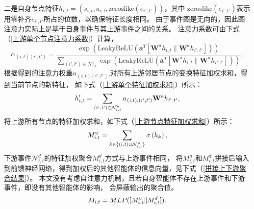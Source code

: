 二是自身节点特征$h_{i,t}=(s_{i,t},a_{i,t},\text{zeroslike}(e_{i',t'}))$，其中
zeroslike$(e_{i',t'})$表示用零补齐$e_{i',t'}$所占的位数，以确保特征长度相同。
由于事件图是无向的，因此图注意力实际上是基于自身事件与其上游事件之间的关系。
注意力系数可由下式（\ref{上游单个节点注意力系数}）计算，
\begin{equation}\label{上游单个节点注意力系数}
\alpha_{(i,t)(i',t')} = \frac{\exp\left(\text{LeakyReLU}\left(\mathbf{a}^T [\mathbf{W}^a h_{i,t} \| \mathbf{W}^a h_{i',t'}]\right)\right)}{\sum_{(i',t')\in\mathcal{N}_{i,t}^u} \exp\left(\text{LeakyReLU}\left(\mathbf{a}^T [\mathbf{W}^a h_{i,t} \| \mathbf{W}^a h_{i',t'}]\right)\right)},
\end{equation}
根据得到的注意力权重$\alpha_{(i,t)(i',t')}$,对所有上游邻居节点的变换特征加权求和，得到当前节点的新特征，
如下式（\ref{上游单个特征加权求和}）所示：
\begin{equation}\label{上游单个特征加权求和}
    \\h'_{i,t} = \sum_{(i',t')\in\mathcal{N}^u_{i,t}} \alpha_{(i,t),(i',t')} \mathbf{W}^a h_{i',t'},
\end{equation}
将上游所有节点的特征加权求和，如下式（\ref{上游节点特征加权求和}）所示：
\begin{equation}\label{上游节点特征加权求和}
    \\M^u_{i,t} = \sum_{k\in\{(i,t)\cup\mathcal{N}^u_{i,t}\}} \sigma\left(h_{k}\right),
\end{equation}
下游事件$\mathcal{N}^d_{i,t}$的特征加权聚合$M^d_{i,t}$方式与上游事件相同，
将$M^u_{i,t}$和$M^d_{i,t}$拼接后输入到前馈神经网络，得到加权后的其他智能体的信息向量，见下式（\ref{拼接上下游聚合结果}）。
本文没有考虑自注意力机制，且若自身智能体不存在上游事件和下游事件，即没有其他智能体的影响，
会屏蔽输出的聚合值。
\begin{equation}\label{拼接上下游聚合结果}
    \\M_{i,t} = MLP([M^u_{i,t} \|M^d_{i,t}] ).
\end{equation}


